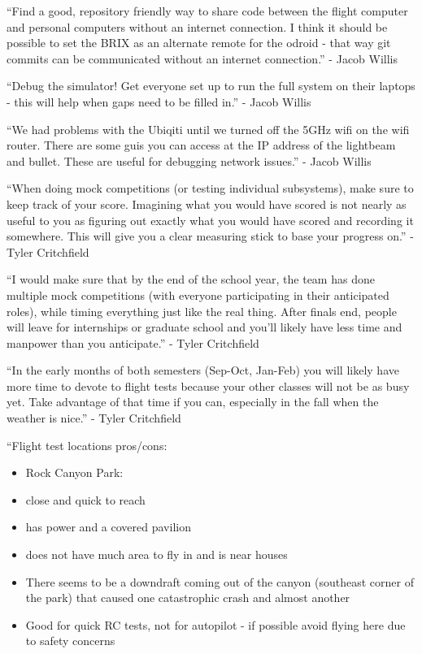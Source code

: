 \documentclass[]{auvsi_doc}
\providecommand{\tightlist}{%
  \setlength{\itemsep}{0pt}\setlength{\parskip}{0pt}}
\begin{document}
{``Find a good, repository friendly way to share code between the flight
computer and personal computers without an internet connection. I think
it should be possible to set the BRIX as an alternate remote for the
odroid - that way git commits can be communicated without an internet
connection.'' - Jacob Willis}

{}

{``Debug the simulator! Get everyone set up to run the full system on
their laptops - this will help when gaps need to be filled in.'' - Jacob
Willis}

{}

{``We had problems with the Ubiqiti until we turned off the 5GHz wifi on
the wifi router. There are some guis you can access at the IP address of
the lightbeam and bullet. These are useful for debugging network
issues.'' - Jacob Willis}

{}

{``When doing mock competitions (or testing individual subsystems), make
sure to keep track of your score. Imagining what you would have scored
is not nearly as useful to you as figuring out exactly what you would
have scored and recording it somewhere. This will give you a clear
measuring stick to base your progress on.'' - Tyler Critchfield}

{}

{``I would make sure that by the end of the school year, the team has
done multiple mock competitions (with everyone participating in their
anticipated roles), while timing everything just like the real thing.
After finals end, people will leave for internships or graduate school
and you'll likely have less time and manpower than you anticipate.'' -
Tyler Critchfield}

{}

{``In the early months of both semesters (Sep-Oct, Jan-Feb) you will
likely have more time to devote to flight tests because your other
classes will not be as busy yet. Take advantage of that time if you can,
especially in the fall when the weather is nice.'' - Tyler Critchfield}


{``Flight test locations pros/cons:}

\begin{itemize}
\tightlist
\item
  {Rock Canyon Park: }
\end{itemize}

\begin{itemize}
\tightlist
\item
  {close and quick to reach}
\item
  {has power and a covered pavilion}
\item
  {does not have much area to fly in and is near houses}
\item
  {There seems to be a downdraft coming out of the canyon (southeast
  corner of the park) that caused one catastrophic crash and almost
  another}
\item
  {Good for quick RC tests, not for autopilot - if possible avoid flying
  here due to safety concerns}
\end{itemize}
\end{document}
